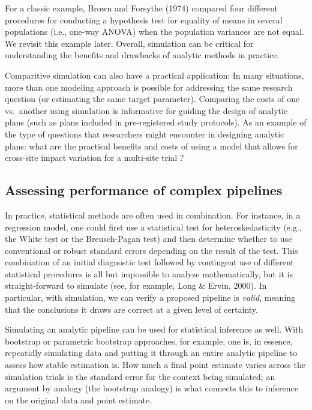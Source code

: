 \documentclass[
]{book}
\begin{document}
For a classic example, Brown and Forsythe (1974) compared four different procedures for conducting a hypothesis test for equality of means in several populations (i.e., one-way ANOVA) when the population variances are not equal.
We revisit this example later.
Overall, simulation can be critical for understanding the benefits and drawbacks of analytic methods in practice.

Comparitive simulation can also have a practical application: In many situations, more than one modeling approach is possible for addressing the same research question (or estimating the same target parameter).
Comparing the costs of one vs.~another using simulation is informative for guiding the design of analytic plans (such as plans included in pre-registered study protocols).
As an example of the type of questions that researchers might encounter in designing analytic plans: what are the practical benefits and costs of using a model that allows for cross-site impact variation for a multi-site trial \citep{miratrix2021applied}?

\hypertarget{assessing-performance-of-complex-pipelines}{%
\subsection{Assessing performance of complex pipelines}\label{assessing-performance-of-complex-pipelines}}

In practice, statistical methods are often used in combination.
For instance, in a regression model, one could first use a statistical test for heteroskedasticity (e.g., the White test or the Breusch-Pagan test) and then determine whether to use conventional or robust standard errors depending on the result of the test. This combination of an initial diagnostic test followed by contingent use of different statistical procedures is all but impossible to analyze mathematically, but it is straight-forward to simulate (see, for example, Long \& Ervin, 2000).
In particular, with simulation, we can verify a proposed pipeline is \emph{valid}, meaning that the conclusions it draws are correct at a given level of certainty.

Simulating an analytic pipeline can be used for statistical inference as well.
With bootstrap or parametric bootstrap approaches, for example, one is, in essence, repeatidly simulating data and putting it through an entire analytic pipeline to assess how stable estimation is.
How much a final point estimate varies across the simulation trials is the standard error for the context being simulated; an argument by analogy (the bootstrap analogy) is what connects this to inference on the original data and point estimate.
\end{document}
